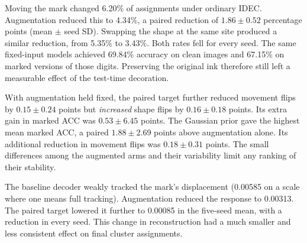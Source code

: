 Moving the mark changed 6.20\% of assignments under ordinary IDEC. Augmentation reduced this to 4.34\%, a paired reduction of $1.86\pm0.52$ percentage points (mean $\pm$ seed SD). Swapping the shape at the same site produced a similar reduction, from 5.35\% to 3.43\%. Both rates fell for every seed. The same fixed-input models achieved 69.84\% accuracy on clean images and 67.15\% on marked versions of those digits. Preserving the original ink therefore still left a measurable effect of the test-time decoration.

With augmentation held fixed, the paired target further reduced movement flips by $0.15\pm0.24$ points but \emph{increased} shape flips by $0.16\pm0.18$ points. Its extra gain in marked ACC was $0.53\pm6.45$ points. The Gaussian prior gave the highest mean marked ACC, a paired $1.88\pm2.69$ points above augmentation alone. Its additional reduction in movement flips was $0.18\pm0.31$ points. The small differences among the augmented arms and their variability limit any ranking of their stability.

The baseline decoder weakly tracked the mark's displacement (0.00585 on a scale where one means full tracking). Augmentation reduced the response to 0.00313. The paired target lowered it further to 0.00085 in the five-seed mean, with a reduction in every seed. This change in reconstruction had a much smaller and less consistent effect on final cluster assignments.
